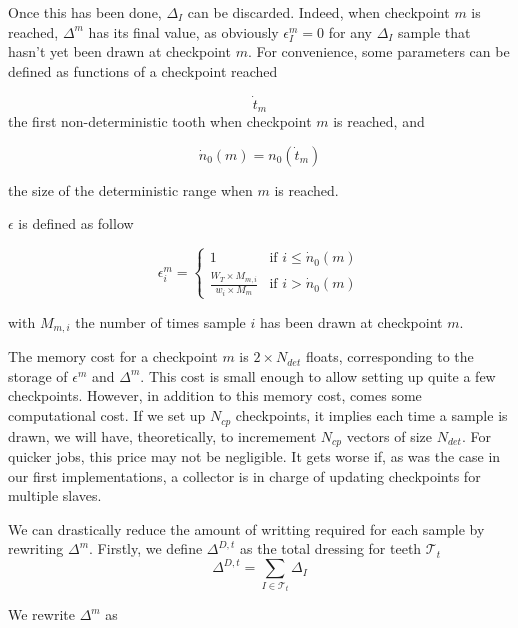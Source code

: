 \documentclass[./thesis.tex]{subfiles}
\begin{document}
Once this has been done, $\Delta_I$ can be discarded. Indeed, when checkpoint $m$ is reached, $\Delta^{m}$ has its final value, as obviously $\epsilon_I^{m} = 0$ for any $\Delta_I$ sample that hasn't yet been drawn at checkpoint ${m}$.
For convenience, some parameters can be defined as functions of a checkpoint reached

\begin{equation}
\dot t_m
\end{equation}
the first non-deterministic tooth when checkpoint $m$ is reached, and

\begin{equation}
\dot n_0(m) = n_0(\dot t_m)
\end{equation}

the size of the deterministic range when $m$ is reached.


$\epsilon$ is defined as follow

\begin{equation}
\epsilon^m_i = 
\begin{cases}
1 & \text{if } i \leq \dot n_0(m) \\
\frac{W_T \times M_{m,i}}{w_i \times M_m} & \text{if } i > \dot n_0(m)
\end{cases}
\end{equation}


with $M_{m,i}$ the number of times sample $i$ has been drawn at checkpoint $m$.


The memory cost for a checkpoint $m$ is $2 \times N_{det}$ floats, corresponding to the storage of $\epsilon^m$ and $\Delta^m$. This cost is small enough to allow setting up quite a few checkpoints. However, in addition to this memory cost, comes some computational cost. If we set up $N_{cp}$ checkpoints, it implies each time a sample is drawn, we will have, theoretically, to incremement $N_{cp}$ vectors of size $N_{det}$. For quicker jobs, this price may not be negligible. It gets worse if, as was the case in our first implementations, a collector is in charge of updating checkpoints for multiple slaves. 


We can drastically reduce the amount of writting required for each sample by rewriting $\Delta^m$.
Firstly, we define $\Delta^{D,t}$ as the total dressing for teeth $\mathcal{T}_t$
\begin{equation}
\Delta^{D,t} = \sum_{I \in \mathcal{T}_t} \Delta_I
\end{equation}

We rewrite $\Delta^m$ as
\end{document}
